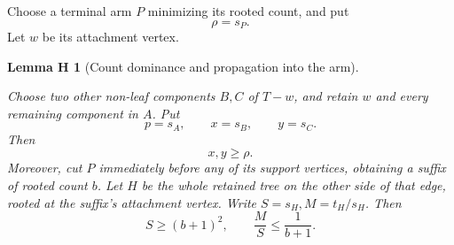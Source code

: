 \documentclass[11pt,reqno]{amsart}
\theoremstyle{plain}
\newtheorem*{hostlemma}{Lemma H}
\begin{document}
Choose a terminal arm \(P\) minimizing its rooted count, and put \[
\rho=s_P.
\tag{2.1}\label{eq:main-2-1}
\] Let \(w\) be its attachment vertex.

\begin{hostlemma}[Count dominance and propagation into the arm]\label{lem:host}

Choose two other non-leaf components \(B,C\) of \(T-w\), and retain \(w\) and every remaining component in \(A\). Put \[
p=s_A,\qquad x=s_B,\qquad y=s_C.
\] Then \[
x,y\ge\rho.
\tag{2.2}\label{eq:main-2-2}
\] Moreover, cut \(P\) immediately before any of its support vertices, obtaining a suffix of rooted count \(b\). Let \(H\) be the whole retained tree on the other side of that edge, rooted at the suffix's attachment vertex. Write \(S=s_H,M=t_H/s_H\). Then \[
\boxed{S\ge(b+1)^2,\qquad \frac MS\le\frac1{b+1}.}
\tag{2.3}\label{eq:main-2-3}
\]

\end{hostlemma}
\end{document}
